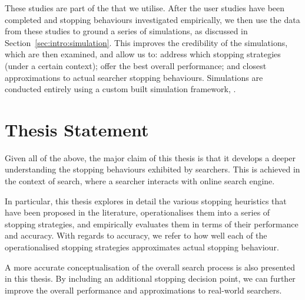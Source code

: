 These studies are part of the  that we utilise. After the user studies have been completed and stopping behaviours investigated empirically, we then use the data from these studies to ground a series of simulations, as discussed in Section~\ref{sec:intro:simulation}. This improves the credibility of the simulations, which are then examined, and allow us to: address which stopping strategies (under a certain context); offer  the best overall performance; and  closest approximations to actual searcher stopping behaviours. Simulations are conducted entirely using a custom built simulation framework, .

\section{Thesis Statement}
Given all of the above, the major claim of this thesis is that it develops a deeper understanding the stopping behaviours exhibited by searchers. This is achieved in the context of search, where a searcher interacts with online search engine.

In particular, this thesis explores in detail the various stopping heuristics that have been proposed in the literature, operationalises them into a series of stopping strategies, and empirically evaluates them in terms of their performance and accuracy. With regards to accuracy, we refer to how well each of the operationalised stopping strategies approximates actual stopping behaviour.

A more accurate conceptualisation of the overall search process is also presented in this thesis. By including an additional stopping decision point, we can further improve the overall performance and approximations to real-world searchers.



